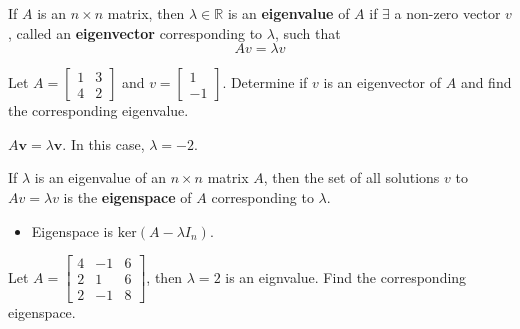 \documentclass[11pt]{scrartcl}
\theoremstyle{dotlessP}
\theoremstyle{dotlessN}
\newcommand{\reals}{\mathbb{R}} %
\newcommand{\kernel}{\text{ker}}
\begin{document}
	\begin{definition}
		If $A$ is an $n \times n$ matrix, then $\lambda \in \reals$ is an \textbf{eigenvalue} of $A$ if $\exists$ a non-zero vector $v$, called an \textbf{eigenvector} corresponding to $\lambda$, such that
		\[
		Av = \lambda v
		\] 
	\end{definition}
	\begin{example}
		Let $A = 
\begin{bmatrix}
	1 & 3 \\
	4 & 2
\end{bmatrix}
		$ and $v = 
\begin{bmatrix}
	1 \\
	-1
\end{bmatrix}
		$. Determine if $v$ is an eigenvector of $A$ and find the corresponding eigenvalue.
	\end{example}
	\begin{soln}
		$A\bm{v} = \lambda \bm{v}$. In this case, $\lambda = -2$.
	\end{soln}
	\begin{definition}
		[Eigenspace]
		If $\lambda$ is an eigenvalue of an $n \times n$ matrix $A$, then the set of all solutions $v$ to $Av = \lambda v$ is the \textbf{eigenspace} of $A$ corresponding to $\lambda$.
	\end{definition}
	\begin{itemize}
		\item Eigenspace is $\kernel (A - \lambda I_n)$.
	\end{itemize}
	\begin{example}
		Let $A = 
\begin{bmatrix}
	4 & -1 & 6 \\
	2 & 1 & 6 \\
	2 & -1 & 8
\end{bmatrix}
		$, then $\lambda = 2$ is an eignvalue. Find the corresponding eigenspace.
	\end{example}
\end{document}
